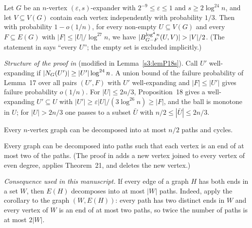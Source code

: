 \begin{citedresult}[{\cite[Lemma~19]{BM}}]\label{s1:citLem19}
Let $G$ be an $n$-vertex $(\varepsilon,s)$-expander with
$2^{-9}\le\varepsilon\le1$ and $s\ge2\log^{24}n$, and let $V\subseteq V(G)$
contain each vertex independently with probability $1/3$. Then with probability
$1-o(1/n)$, for every non-empty $U\subseteq V(G)$ and every $F\subseteq E(G)$ with
$|F|\le|U|/\log^{27}n$, we have $|\Ball{\log^4n}{G-F}{U,V}|>|V|/2$. (The
statement in \cite{BM} says ``every $U$''; the empty set is excluded implicitly.)

\emph{Structure of the proof in \cite{BM}} (modified in
Lemma~\ref{s3:lemP18s}). Call $U'$ well-expanding if
$|N_G(U')|\ge|U'|\log^{24}n$. A union bound of the failure probability of
Lemma~17 over all pairs $(U',F)$ with $U'$ well-expanding and $|F|\le|U'|$ gives
failure probability $o(1/n)$. For $|U|\le2n/3$, Proposition~18 gives a
well-expanding $U'\subseteq U$ with $|U'|\ge\varepsilon|U|/(3\log^{26}n)\ge|F|$,
and the ball is monotone in $U$; for $|U|>2n/3$ one passes to a subset $\bar U$
with $n/2\le|\bar U|\le2n/3$.
\end{citedresult}

\begin{citedresult}\label{s1:citThm21}
Every $n$-vertex graph can be decomposed into at most $n/2$ paths and
cycles.
\end{citedresult}

\begin{citedresult}[{\cite[Corollary~22]{BM}}]\label{s1:citCor22}
Every graph can be decomposed into paths such that each vertex is an end of at
most two of the paths. (The proof in \cite{BM} adds a new vertex joined to every
vertex of even degree, applies Theorem~21, and deletes the new
vertex.)

\emph{Consequence used in this manuscript.} If every edge of a graph $H$ has both
ends in a set $W$, then $E(H)$ decomposes into at most $|W|$ paths. Indeed, apply
the corollary to the graph $(W,E(H))$: every path has two distinct ends in $W$
and every vertex of $W$ is an end of at most two paths, so twice the number of
paths is at most $2|W|$.
\end{citedresult}

